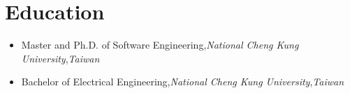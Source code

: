 \documentclass[letterpaper,11pt]{article}
\newcommand{\resumeEducationItem}[3]{
  \vspace{-1pt}\item
    {#1}{,}\hspace{4pt}\textit{#2}{,}\hspace{4pt}\textit{#3}\vspace{-6pt}
}
\newcommand{\resumeSubHeadingListStart}{\begin{itemize}[leftmargin=*]}
\newcommand{\resumeSubHeadingListEnd}{\end{itemize}}
\begin{document}
\section{Education}
  \resumeSubHeadingListStart
    \resumeEducationItem
      {Master and Ph.D. of Software Engineering}{National Cheng Kung University}{Taiwan}
    \resumeEducationItem
      {Bachelor of Electrical Engineering}{National Cheng Kung University}{Taiwan}
  \resumeSubHeadingListEnd

%


\end{document}
